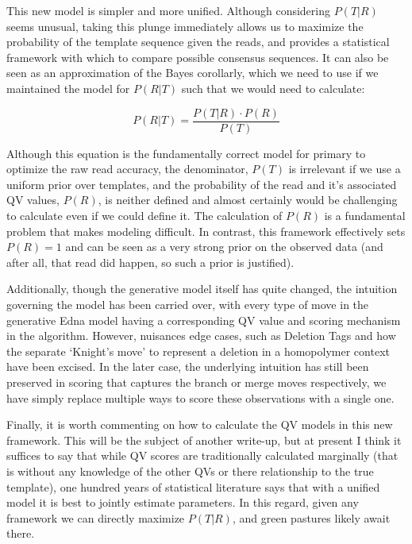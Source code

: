 \documentclass[fleqn,10pt]{SelfArx} %
\begin{document}
This new model is simpler and more unified.  Although considering $P(T|R)$ seems unusual, taking this plunge immediately allows us to maximize the probability of the template sequence given the reads, and provides a statistical framework with which to compare possible consensus sequences.  It can also be seen as an approximation of the Bayes corollarly, which we need to use if we maintained the model for $P(R|T)$ such that we would need to calculate:

\begin{dmath}
P(R|T) = \frac{P(T|R) \cdot P(R)}{P(T)}
\end{dmath}

Although this equation is the fundamentally correct model for primary to optimize the raw read accuracy, the denominator, $P(T)$ is irrelevant if we use a uniform prior over templates, and the probability of the read and it's associated QV values, $P(R)$, is neither defined and almost certainly would be challenging to calculate even if we could define it.  The calculation of $P(R)$ is a fundamental problem that makes modeling difficult.  In contrast, this framework effectively sets $P(R) = 1$ and can be seen as a very strong prior on the observed data (and after all, that read did happen, so such a prior is justified).  

  Additionally, though the generative model itself has quite changed, the intuition governing the model has been carried over, with every type of move in the generative Edna model having a corresponding QV value and scoring mechanism in the algorithm.  However, nuisances edge cases, such as Deletion Tags and how the separate  `Knight's move' to represent a deletion in a homopolymer context have been excised.   In the later case, the underlying intuition has still been preserved in scoring that captures the branch or merge moves respectively, we have simply replace multiple ways to score these observations with a single one.

Finally, it is worth commenting on how to calculate the QV models in this new framework.  This will be the subject of another write-up, but at present I think it suffices to say that while QV scores are traditionally calculated marginally (that is without any knowledge of the other QVs or there relationship to the true template), one hundred years of statistical literature says that with a unified model it is best to jointly estimate parameters.  In this regard, given any framework we can directly maximize $P(T|R)$, and green pastures likely await there.


    
  

\end{document}
